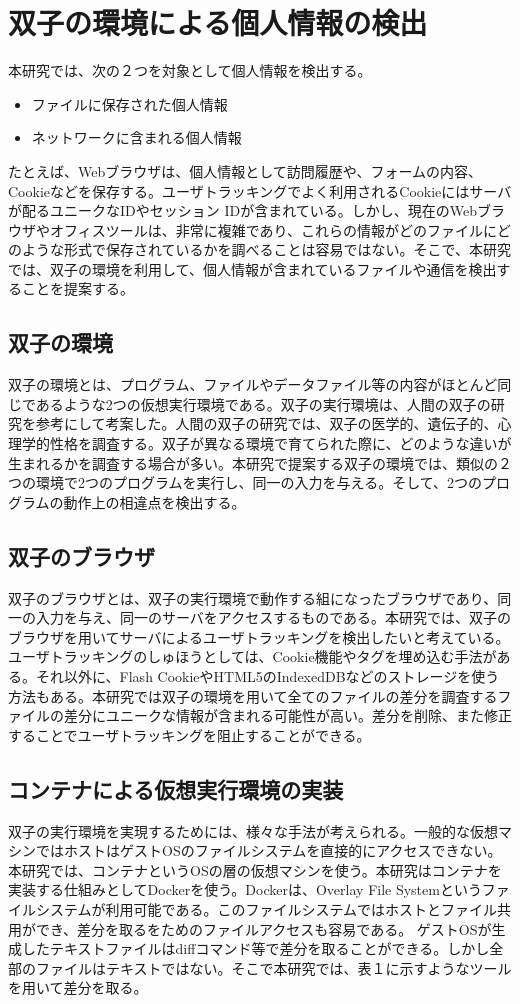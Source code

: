 \documentclass{ipsjpapers}
\begin{document}
\section{双子の環境による個人情報の検出}
本研究では、次の２つを対象として個人情報を検出する。
\begin{itemize}
\item 
ファイルに保存された個人情報
\item
ネットワークに含まれる個人情報
\end{itemize}
たとえば、Webブラウザは、個人情報として訪問履歴や、フォームの内容、Cookieなどを保存する。ユーザトラッキングでよく利用されるCookieにはサーバが配るユニークなIDやセッション IDが含まれている。しかし、現在のWebブラウザやオフィスツールは、非常に複雑であり、これらの情報がどのファイルにどのような形式で保存されているかを調べることは容易ではない。そこで、本研究では、双子の環境を利用して、個人情報が含まれているファイルや通信を検出することを提案する。

\subsection{双子の環境}
双子の環境とは、プログラム、ファイルやデータファイル等の内容がほとんど同じであるような2つの仮想実行環境である。双子の実行環境は、人間の双子の研究を参考にして考案した。人間の双子の研究では、双子の医学的、遺伝子的、心理学的性格を調査する。双子が異なる環境で育てられた際に、どのような違いが生まれるかを調査する場合が多い。本研究で提案する双子の環境では、類似の２つの環境で2つのプログラムを実行し、同一の入力を与える。そして、2つのプログラムの動作上の相違点を検出する。
\subsection{双子のブラウザ}
双子のブラウザとは、双子の実行環境で動作する組になったブラウザであり、同一の入力を与え、同一のサーバをアクセスするものである。本研究では、双子のブラウザを用いてサーバによるユーザトラッキングを検出したいと考えている。ユーザトラッキングのしゅほうとしては、Cookie機能やタグを埋め込む手法がある。それ以外に、Flash CookieやHTML5のIndexedDBなどのストレージを使う方法もある。本研究では双子の環境を用いて全てのファイルの差分を調査するファイルの差分にユニークな情報が含まれる可能性が高い。差分を削除、また修正することでユーザトラッキングを阻止することができる。
\subsection{コンテナによる仮想実行環境の実装}
双子の実行環境を実現するためには、様々な手法が考えられる。一般的な仮想マシンではホストはゲストOSのファイルシステムを直接的にアクセスできない。本研究では、コンテナというOSの層の仮想マシンを使う。本研究はコンテナを実装する仕組みとしてDocker\cite{docker}を使う。Dockerは、Overlay File Systemというファイルシステムが利用可能である。このファイルシステムではホストとファイル共用ができ、差分を取るをためのファイルアクセスも容易である。
ゲストOSが生成したテキストファイルはdiffコマンド等で差分を取ることができる。しかし全部のファイルはテキストではない。そこで本研究では、表１に示すようなツールを用いて差分を取る。
\end{document}
